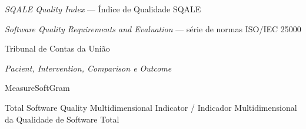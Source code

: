 \begin{siglas}
  \item[SQI]    \textit{SQALE Quality Index} — Índice de Qualidade SQALE
  \item[SQuaRE] \textit{Software Quality Requirements and Evaluation} — série de normas ISO/IEC 25000
  \item[TCU]    Tribunal de Contas da União
  \item[PICO] \textit{Pacient, Intervention, Comparison e Outcome}
  \item[MSGRAM] MeasureSoftGram
  \item[TSQMI] Total Software Quality Multidimensional Indicator / Indicador Multidimensional da Qualidade de Software Total
\end{siglas}
